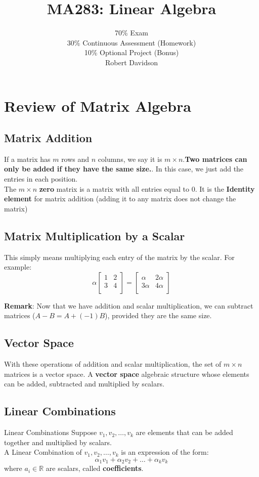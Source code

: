 \documentclass[a4paper, 9pt]{extarticle}
\title{
\textbf{MA283: Linear Algebra} \\ 
}
\author{
  70\% Exam\\
30\% Continuous Assessment (Homework) \\
10\% Optional Project (Bonus)\\ [2ex]
Robert Davidson
}
\date{}       %
\begin{document}
\maketitle
\pagebreak

\tableofcontents
\pagebreak
\section{Review of Matrix Algebra}
\subsection*{Matrix Addition}
If a matrix has $m$ rows and $n$ columns, we say it is $m \times n$.\textbf{Two matrices can only be added if they have the same size.}. In this case, we just add the entries in each position. \\[2ex]
The $m \times n$ \textbf{zero} matrix is a matrix with all entries equal to $0$. It is the \textbf{Identity element} for matrix addition (adding it to any matrix does not change the matrix)
\subsection*{Matrix Multiplication by a Scalar}
This simply means multiplying each entry of the matrix by the scalar. For example:
$$
  \alpha \begin{bmatrix}
    1 & 2 \\
    3 & 4 \\
  \end{bmatrix}
  =
  \begin{bmatrix}
    \alpha  & 2\alpha \\
    3\alpha & 4\alpha \\
  \end{bmatrix}
$$

\textbf{Remark}: Now that we have addition and scalar multiplication, we can subtract matrices ($A - B = A + (-1)B$), provided they are the same size.

\subsection*{Vector Space}
With these operations of addition and scalar multiplication, the set of
$m \times n$ matrices is a vector space. A \textbf{vector space} algebraic structure whose elements can be added, subtracted and multiplied by scalars.

\subsection*{Linear Combinations}
\begin{definitionbox}{Linear Combinations}{}
  Suppose $v_1, v_2, \dots, v_k$ are elements that can be added together and multiplied by scalars. \\[2ex]
  A Linear Combination of $v_1, v_2, \dots, v_k$ is an expression of the form:
  $$
    \alpha_1 v_1 + \alpha_2 v_2 + \ldots + \alpha_k v_k
  $$
  where $a_i \in \mathbb{R}$ are scalars, called \textbf{coefficients}.
\end{definitionbox}
\end{document}
